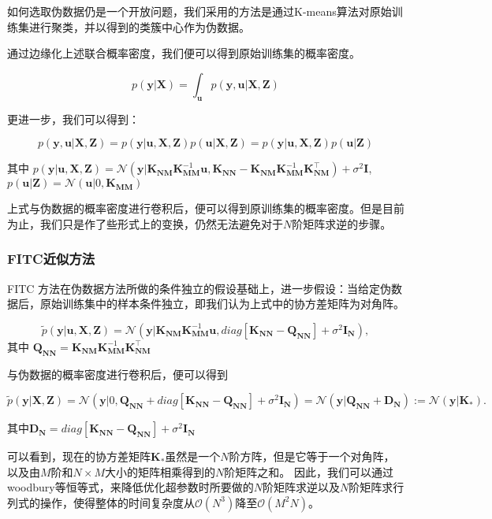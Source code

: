 如何选取伪数据仍是一个开放问题，我们采用的方法是通过K-means算法对原始训练集进行聚类，并以得到的类簇中心作为伪数据。

通过边缘化上述联合概率密度，我们便可以得到原始训练集的概率密度。

      \[p(\mathbf{y}|\mathbf{X})=\int_{\mathbf{u}}p(\mathbf{y},\mathbf{u}|\mathbf{X},\mathbf{Z})\]

更进一步，我们可以得到：

      \[p(\mathbf{y},\mathbf{u}|\mathbf{X},\mathbf{Z})=p(\mathbf{y}|\mathbf{u},\mathbf{X},\mathbf{Z})p(\mathbf{u}|\mathbf{X},\mathbf{Z})=p(\mathbf{y}|\mathbf{u},\mathbf{X},\mathbf{Z})p(\mathbf{u}|\mathbf{Z})\]

    其中
      $p (\mathbf{y}|\mathbf{u},\mathbf{X},\mathbf{Z}) = \mathcal{N}(\mathbf{y}|\mathbf{K}_{\mathbf{NM}}\mathbf{K}^{-1}_{\mathbf{MM}}\mathbf{u},\mathbf{K}_{\mathbf{NN}}-\mathbf{K}_{\mathbf{NM}}\mathbf{K}_{\mathbf{MM}}^{-1}\mathbf{K}_{\mathbf{NM}}^{\top}) + \sigma^2\mathbf{I}$,
      $p(\mathbf{u}|\mathbf{Z})                        = \mathcal{N}(\mathbf{u}|0,\mathbf{K}_{\mathbf{MM}})$

上式与伪数据的概率密度进行卷积后，便可以得到原训练集的概率密度。但是目前为止，我们只是作了些形式上的变换，仍然无法避免对于$N$阶矩阵求逆的步骤。

\subsubsection{FITC近似方法}

FITC 方法在伪数据方法所做的条件独立的假设基础上，进一步假设：当给定伪数据后，原始训练集中的样本条件独立，即我们认为上式中的协方差矩阵为对角阵。

      \[\tilde{p} (\mathbf{y}|\mathbf{u},\mathbf{X},\mathbf{Z}) = \mathcal{N}(\mathbf{y}|\mathbf{K}_{\mathbf{NM}}\mathbf{K}^{-1}_{\mathbf{MM}}\mathbf{u},diag[\mathbf{K}_{\mathbf{NN}}-\mathbf{Q}_{\mathbf{NN}}] + \sigma^2\mathbf{I}_{\mathbf{N}}),\]
      其中 $\mathbf{Q}_{\mathbf{NN}} = \mathbf{K}_{\mathbf{NM}}\mathbf{K}_{\mathbf{MM}}^{-1}\mathbf{K}_{\mathbf{NM}}^{\top}$

与伪数据的概率密度进行卷积后，便可以得到

      \[\tilde{p} (\mathbf{y}|\mathbf{X},\mathbf{Z}) = \mathcal{N}(\mathbf{y}|0,\mathbf{Q}_{\mathbf{NN}}+diag[\mathbf{K}_{\mathbf{NN}}-\mathbf{Q}_{\mathbf{NN}}] + \sigma^2\mathbf{I}_{\mathbf{N}})=\mathcal{N}(\mathbf{y}|\mathbf{Q}_{\mathbf{NN}}+\mathbf{D}_{\mathbf{N}}):=\mathcal{N}(\mathbf{y}|\mathbf{K}_*).\]

      其中$\mathbf{D}_{\mathbf{N}} = diag[\mathbf{K}_{\mathbf{NN}}-\mathbf{Q}_{\mathbf{NN}}] + \sigma^2\mathbf{I}_{\mathbf{N}}$

      可以看到，现在的协方差矩阵$\mathbf{K}_*$虽然是一个$N$阶方阵，但是它等于一个对角阵，以及由$M$阶和$N\times M$大小的矩阵相乘得到的$N$阶矩阵之和。
      因此，我们可以通过woodbury等恒等式，来降低优化超参数时所要做的$N$阶矩阵求逆以及$N$阶矩阵求行列式的操作，使得整体的时间复杂度从$\mathcal{O}(N^3)$降至$\mathcal{O}(M^2N)$。